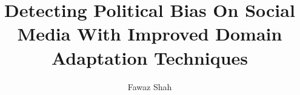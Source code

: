 \documentclass[a4paper, twoside]{report}
\title{Detecting Political Bias On Social Media With Improved Domain Adaptation Techniques}
\author{Fawaz Shah}
\begin{document}


\begin{abstract}

\end{abstract}

\renewcommand{\abstractname}{Acknowledgements}
\begin{abstract}

\end{abstract}

\tableofcontents
\listoffigures
\listoftables









\end{document}
